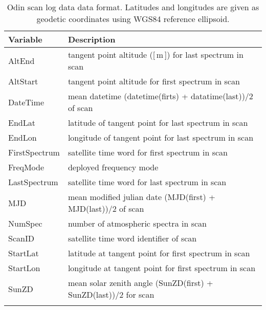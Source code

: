 \begin{longtable}{| p{} | p{} |}
\hline
  \textbf{Variable} & \textbf{Description} \\
  \hline
    AltEnd                & tangent point altitude ([\,m\,]) for last spectrum in scan \\ \hline
    AltStart              & tangent point altitude for first spectrum in scan \\ \hline
    DateTime              & mean datetime (datetime(firts) + datatime(last))/2 of scan \\ \hline
    EndLat                & latitude of tangent point for last spectrum in scan \\ \hline
    EndLon                & longitude of tangent point for last spectrum in scan \\ \hline
    FirstSpectrum         & satellite time word for first spectrum in scan \\ \hline
    FreqMode              & deployed frequency mode \\ \hline
    LastSpectrum          & satellite time word for last spectrum in scan \\ \hline
    MJD                   & mean modified julian date (MJD(first) + MJD(last))/2 of scan \\ \hline
    NumSpec               & number of atmospheric spectra in scan \\ \hline
    ScanID                & satellite time word identifier of scan\\ \hline
    StartLat              & latitude at tangent point for first spectrum in scan \\ \hline
    StartLon              & longitude at tangent point for first spectrum in scan \\ \hline
    SunZD                 & mean solar zenith angle  (SunZD(first) + SunZD(last))/2 for scan\\ \hline
\hline
\caption{ Odin scan log data data format. Latitudes and longitudes are given as geodetic
coordinates using WGS84 reference ellipsoid.}
\label{table:logdataformat}
\end{longtable}


  


